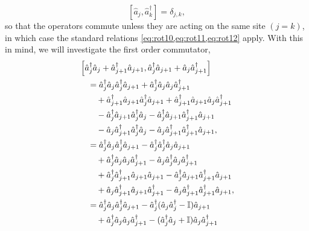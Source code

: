\begin{equation}
	\left[\hat{a}_{j}, \hat{a}_{k}^{\dagger}\right] = \delta_{j,k},
	\label{eq:rot26}
\end{equation}
so that the operators commute unless they are acting on the same site \((j=k)\), in which case the standard relations \cref{eq:rot10,eq:rot11,eq:rot12} apply. With this in mind, we will investigate the first order commutator,
\begin{align}
	 &\left[\hat{a}_{j}^{\dagger}\hat{a}_{j} + \hat{a}_{j+1}^{\dagger}\hat{a}_{j+1}, \hat{a}_{j}^{\dagger}\hat{a}_{j+1} + \hat{a}_{j}\hat{a}_{j+1}^{\dagger}\right] \notag \\ 
	 &\quad= \hat{a}_{j}^{\dagger}\hat{a}_{j}\hat{a}_{j}^{\dagger}\hat{a}_{j+1} + \hat{a}_{j}^{\dagger}\hat{a}_{j}\hat{a}_{j}\hat{a}_{j+1}^{\dagger} \notag \\
	 &\qquad + \hat{a}_{j+1}^{\dagger}\hat{a}_{j+1}\hat{a}_{j}^{\dagger}\hat{a}_{j+1} + \hat{a}_{j+1}^{\dagger}\hat{a}_{j+1}\hat{a}_{j}\hat{a}_{j+1}^{\dagger} \notag \\
	 &\qquad - \hat{a}_{j}^{\dagger}\hat{a}_{j+1}\hat{a}_{j}^{\dagger}\hat{a}_{j} - \hat{a}_{j}^{\dagger}\hat{a}_{j+1}\hat{a}_{j+1}^{\dagger}\hat{a}_{j+1} \notag \\
	 &\qquad - \hat{a}_{j}\hat{a}_{j+1}^{\dagger}\hat{a}_{j}^{\dagger}\hat{a}_{j} - \hat{a}_{j}\hat{a}_{j+1}^{\dagger}\hat{a}_{j+1}^{\dagger}\hat{a}_{j+1}, \notag \\
	 &\quad= \hat{a}_{j}^{\dagger}\hat{a}_{j}\hat{a}_{j}^{\dagger}\hat{a}_{j+1} - \hat{a}_{j}^{\dagger}\hat{a}_{j}^{\dagger}\hat{a}_{j}\hat{a}_{j+1} \notag \\
	 &\qquad + \hat{a}_{j}^{\dagger}\hat{a}_{j}\hat{a}_{j}\hat{a}_{j+1}^{\dagger} - \hat{a}_{j}\hat{a}_{j}^{\dagger}\hat{a}_{j}\hat{a}_{j+1}^{\dagger} \notag \\
	 &\qquad + \hat{a}_{j}^{\dagger}\hat{a}_{j+1}^{\dagger}\hat{a}_{j+1}\hat{a}_{j+1} - \hat{a}_{j}^{\dagger}\hat{a}_{j+1}\hat{a}_{j+1}^{\dagger}\hat{a}_{j+1} \notag \\ 
	 &\qquad + \hat{a}_{j}\hat{a}_{j+1}^{\dagger}\hat{a}_{j+1}\hat{a}_{j+1}^{\dagger} - \hat{a}_{j}\hat{a}_{j+1}^{\dagger}\hat{a}_{j+1}^{\dagger}\hat{a}_{j+1}, \notag \\
	 &\quad= \hat{a}_{j}^{\dagger}\hat{a}_{j}\hat{a}_{j}^{\dagger}\hat{a}_{j+1} - \hat{a}_{j}^{\dagger}(\hat{a}_{j}\hat{a}_{j}^{\dagger} - \mathbb{I})\hat{a}_{j+1} \notag \\
	 &\qquad + \hat{a}_{j}^{\dagger}\hat{a}_{j}\hat{a}_{j}\hat{a}_{j+1}^{\dagger} - (\hat{a}_{j}^{\dagger}\hat{a}_{j} + \mathbb{I})\hat{a}_{j}\hat{a}_{j+1}^{\dagger} \notag \\

\end{align}

